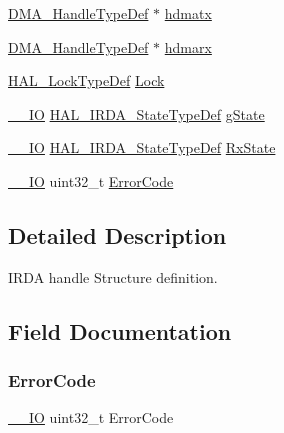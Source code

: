 \begin{DoxyCompactItemize}
\hyperlink{group___d_m_a___exported___types_ga92b907d56a9c29b93d46782a7a04f91e}{D\+M\+A\+\_\+\+Handle\+Type\+Def} $\ast$ \hyperlink{struct_i_r_d_a___handle_type_def_a33e13c28b1a70e6164417abb026d7a22}{hdmatx}
\item 
\hyperlink{group___d_m_a___exported___types_ga92b907d56a9c29b93d46782a7a04f91e}{D\+M\+A\+\_\+\+Handle\+Type\+Def} $\ast$ \hyperlink{struct_i_r_d_a___handle_type_def_abd0aeec20298a55d89a440320e35634f}{hdmarx}
\item 
\hyperlink{stm32f0xx__hal__def_8h_ab367482e943333a1299294eadaad284b}{H\+A\+L\+\_\+\+Lock\+Type\+Def} \hyperlink{struct_i_r_d_a___handle_type_def_ad4cf225029dbefe8d3fe660c33b8bb6b}{Lock}
\item 
\hyperlink{core__sc300_8h_aec43007d9998a0a0e01faede4133d6be}{\+\_\+\+\_\+\+IO} \hyperlink{group___i_r_d_a___exported___types_gab3e65b75c9d4ae39bc50a31222509e1e}{H\+A\+L\+\_\+\+I\+R\+D\+A\+\_\+\+State\+Type\+Def} \hyperlink{struct_i_r_d_a___handle_type_def_a5075d3e29bb3a5fba531c19a779dec46}{g\+State}
\item 
\hyperlink{core__sc300_8h_aec43007d9998a0a0e01faede4133d6be}{\+\_\+\+\_\+\+IO} \hyperlink{group___i_r_d_a___exported___types_gab3e65b75c9d4ae39bc50a31222509e1e}{H\+A\+L\+\_\+\+I\+R\+D\+A\+\_\+\+State\+Type\+Def} \hyperlink{struct_i_r_d_a___handle_type_def_a2cb6641cbcc13a2824d3e3cfcb37c6aa}{Rx\+State}
\item 
\hyperlink{core__sc300_8h_aec43007d9998a0a0e01faede4133d6be}{\+\_\+\+\_\+\+IO} uint32\+\_\+t \hyperlink{struct_i_r_d_a___handle_type_def_a123c5063e6a3b1901b2fbe5f88c53a7e}{Error\+Code}
\end{DoxyCompactItemize}


\subsection{Detailed Description}
I\+R\+DA handle Structure definition. 

\subsection{Field Documentation}
\mbox{\label{struct_i_r_d_a___handle_type_def_a123c5063e6a3b1901b2fbe5f88c53a7e}} 
\subsubsection{\texorpdfstring{Error\+Code}{ErrorCode}}
{\footnotesize\ttfamily \hyperlink{core__sc300_8h_aec43007d9998a0a0e01faede4133d6be}{\+\_\+\+\_\+\+IO} uint32\+\_\+t Error\+Code}

